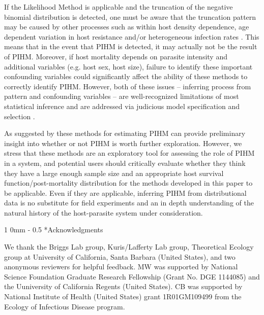 \documentclass[12pt, a4paper]{article}
\makeatletter
\renewcommand{\section}{\@startsection
{section}%
{1}%
{0mm}%
{-\baselineskip}%
{0.5\baselineskip}%
{\normalfont\bf\large}} %
\makeatother
\begin{document}
If the Likelihood Method is applicable and the truncation of the negative binomial distribution is detected, one must be aware that the truncation pattern may be caused by other
processes such as within host density dependence, age dependent variation in host
resistance and/or heterogeneous infection rates \citep{Anderson1982a,Rousset1996, McCallum2000a}. This means that in the event
that PIHM is detected, it may actually not be the result of PIHM.  Moreover, if host mortality depends on parasite intensity and additional variables (e.g. host sex, host size), failure to identify these important confounding variables could significantly affect the ability of these methods to correctly identify PIHM. However, both of these issues -- inferring process from pattern and confounding variables -- are well-recognized limitations of most statistical inference and are addressed via judicious model specification and selection \citep{Seber2003}.

As suggested by \cite{Lester1984} these methods for estimating PIHM can
provide preliminary insight into whether or not PIHM is worth further
exploration.  However, we stress that these methods are an
exploratory tool for assessing the role of PIHM in a system, and potential
users should critically evaluate whether they think they have a large enough
sample size and an appropriate host survival function/post-mortality distribution for the methods developed
in this paper to be applicable.  Even if they are applicable, inferring PIHM
from distributional data is no substitute for field experiments
and an in depth understanding of the natural history of the host-parasite
system under consideration.

\section*{Acknowledgments}

We thank the Briggs Lab group, Kuris/Lafferty Lab group, Theoretical Ecology group at University of California, Santa Barbara (United States), and two anonymous reviewers for helpful feedback.  MW was supported by National Science Foundation Graduate Research Fellowship (Grant No. DGE 1144085) and the Uuniversity of California Regents (United States). CB was supported by National Institute of Health (United States) grant 1R01GM109499 from the Ecology of Infectious Disease program.

\end{document}
